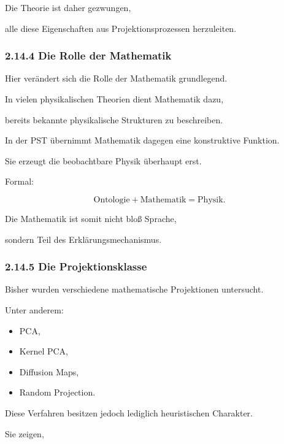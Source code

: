 Die Theorie ist daher gezwungen,

alle diese Eigenschaften aus Projektionsprozessen herzuleiten.


\subsubsection*{2.14.4 Die Rolle der Mathematik}

Hier verändert sich die Rolle der Mathematik grundlegend.

In vielen physikalischen Theorien dient Mathematik dazu,

bereits bekannte physikalische Strukturen zu beschreiben.

In der PST übernimmt Mathematik dagegen eine konstruktive Funktion.

Sie erzeugt die beobachtbare Physik überhaupt erst.

Formal:

\[
\boxed{
\text{Ontologie}
+
\text{Mathematik}
=
\text{Physik}.
}
\]

Die Mathematik ist somit nicht bloß Sprache,

sondern Teil des Erklärungsmechanismus.


\subsubsection*{2.14.5 Die Projektionsklasse}

Bisher wurden verschiedene mathematische Projektionen untersucht.

Unter anderem:

\begin{itemize}

\item PCA,

\item Kernel PCA,

\item Diffusion Maps,

\item Random Projection.

\end{itemize}

Diese Verfahren besitzen jedoch lediglich heuristischen Charakter.

Sie zeigen,

